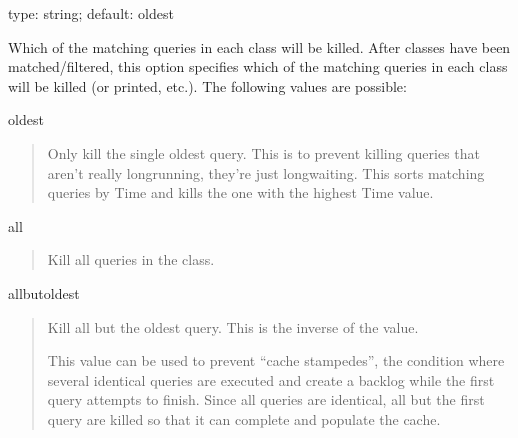 \documentclass[letterpaper,10pt,english]{sphinxmanual}
\begin{document}
\begin{fulllineitems}
\label{\detokenize{mariadb-kill:cmdoption-mariadb-kill-victims}}
\sphinxAtStartPar
type: string; default: oldest

\sphinxAtStartPar
Which of the matching queries in each class will be killed.  After classes
have been matched/filtered, this option specifies which of the matching
queries in each class will be killed (or printed, etc.).  The following
values are possible:

\sphinxAtStartPar
oldest
\begin{quote}

\sphinxAtStartPar
Only kill the single oldest query.  This is to prevent killing queries that
aren’t really long\sphinxhyphen{}running, they’re just long\sphinxhyphen{}waiting.  This sorts matching
queries by Time and kills the one with the highest Time value.
\end{quote}

\sphinxAtStartPar
all
\begin{quote}

\sphinxAtStartPar
Kill all queries in the class.
\end{quote}

\sphinxAtStartPar
all\sphinxhyphen{}but\sphinxhyphen{}oldest
\begin{quote}

\sphinxAtStartPar
Kill all but the oldest query.  This is the inverse of the  value.

\sphinxAtStartPar
This value can be used to prevent “cache stampedes”, the condition where
several identical queries are executed and create a backlog while the first
query attempts to finish.  Since all queries are identical, all but the first
query are killed so that it can complete and populate the cache.
\end{quote}

\end{fulllineitems}

\end{document}
